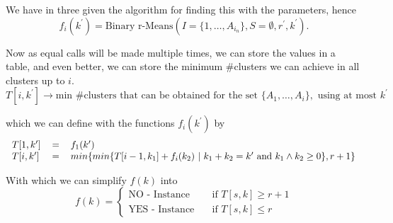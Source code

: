 \documentclass[a4paper]{article}
\begin{document}
We have in  three given the algorithm for finding this with the parameters, hence
\[
    f_i(k^\prime) = \text{Binary r-Means}(I=\{1,\dots, A_{i_n}\}, S = \emptyset, r^\prime, k^\prime).
\]

Now as equal calls will be made multiple times, we can store the values in a table, and even better, we can store the minimum \#clusters we can achieve in all clusters up to $i$.
\[
    T[i, k^\prime] \rightarrow \text{min \#clusters that can be obtained for the set } \{A_1, \dots, A_i\}, \text{ using at most } k^\prime
\]

which we can define with the functions $f_i(k^\prime)$ by
\[
    \begin{tabular}{lcl}
        $T[1, k^\prime]$ & $=$ & $f_1(k^\prime)$                                                                                              \\
        $T[i, k^\prime]$ & $=$ & $min\{ min\{ T[ i-1, k_1 ] + f_i(k_2) ~|~ k_1 + k_2 = k^\prime \text{~and~} k_1 \wedge k_2 \geq 0\}, r+1 \}$
    \end{tabular}
\]

With which we can simplify $f(k)$ into
\[ f(k) =
    \begin{cases}
        \text{NO - Instance}  & \quad \text{if } T[s,k] \geq r+1 \\
        \text{YES - Instance} & \quad \text{if } T[s,k] \leq r
    \end{cases}
\]
\end{document}
